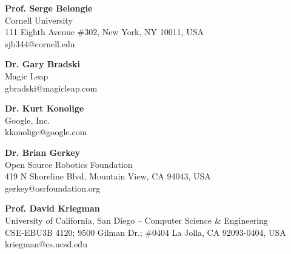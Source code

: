 

\textbf{Prof. Serge Belongie}\\
Cornell University\\
111 Eighth Avenue \#302, New York, NY 10011, USA\\
sjb344@cornell.edu

\textbf{Dr. Gary Bradski}\\
Magic Leap\\
gbradski@magicleap.com

\textbf{Dr. Kurt Konolige}\\
Google, Inc. \\
kkonolige@google.com

\textbf{Dr. Brian Gerkey}\\
Open Source Robotics Foundation\\
419 N Shoreline Blvd, Mountain View, CA 94043, USA\\
gerkey@osrfoundation.org

\textbf{Prof. David Kriegman}\\
University of California, San Diego – Computer Science \& Engineering\\
CSE-EBU3B 4120; 9500 Gilman Dr.; \#0404 La Jolla, CA 92093-0404, USA\\
kriegman@cs.ucsd.edu
